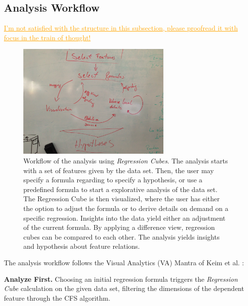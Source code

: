 \documentclass[journal]{style/vgtc} 			          %
\newcommand{\com}[1]{\textcolor{orange}{\uline{#1}}}
\begin{document}
\subsection{Analysis Workflow}
\com{I'm not satisfied with the structure in this subsection, please proofread it with focus in the train of thought!}
\begin{figure}[htb]
 \centering
 \includegraphics[width=3.0in]{figures/workflow_sketch}
 \caption{
 Workflow of the analysis using \emph{Regression Cubes}.
 The analysis starts with a set of features given by the data set.
 Then, the user may specify a formula regarding to specify a hypothesis, or use a predefined formula to start a explorative analysis of the data set.
 The Regression Cube is then visualized, where the user has either the option to adjust the formula or to derive details on demand on a specific regression.
 Insights into the data yield either an adjustment of the current formula.
 By applying a difference view, regression cubes can be compared to each other.
 The analysis yields insights and hypothesis about feature relations.
 }
  \label{fig:Workflow}
\end{figure}
The analysis workflow follows the Visual Analytics (VA) Mantra of Keim et al. \cite{Keim}:

\textbf{Analyze First.} Choosing an initial regression formula triggers the \emph{Regression Cube} calculation on the given data set, filtering the dimensions of the dependent feature through the CFS algorithm.
\end{document}
